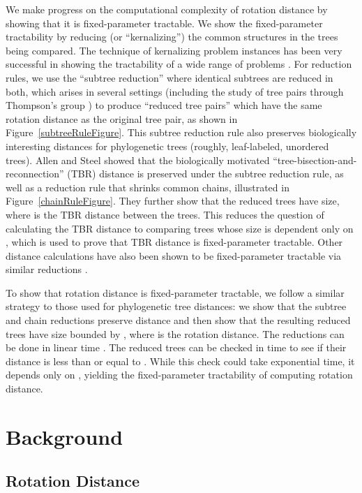 \documentclass[12pt]{article}
\begin{document}
We
make progress on the computational complexity of rotation distance by showing that it
is fixed-parameter tractable.  
We show the fixed-parameter tractability by reducing (or ``kernalizing'') the
common structures in the trees being compared.  
The technique of kernalizing problem instances has been very successful in 
showing the tractability of a wide range of problems \cite{Fellows2006a,Guo2007a}.
For
reduction rules, we use the ``subtree reduction'' where
identical subtrees are reduced in both, which arises in several settings
(including the study of tree pairs through Thompson's group 
\cite{rotbound, rotipl, rightarm}) to produce ``reduced tree pairs''  which have 
 the same rotation distance as 
the original tree pair, as shown in Figure~\ref{subtreeRuleFigure}.  This subtree
reduction rule also preserves biologically interesting
distances for phylogenetic trees (roughly, leaf-labeled,
unordered trees).  Allen and Steel \cite{allenSteel} 
showed that the biologically motivated ``tree-bisection-and-reconnection'' (TBR)
distance is preserved under the subtree reduction
rule, as well as a reduction rule that shrinks common chains,
illustrated in Figure~\ref{chainRuleFigure}.
They further show that the reduced trees have
  size, where  is the TBR distance between the
trees.  This reduces the question of calculating the 
TBR distance to comparing trees whose size is 
dependent only on , which is used to prove that TBR distance 
is fixed-parameter tractable.  Other distance calculations
have also been shown to be fixed-parameter tractable
via similar reductions \cite{uSPRfpt,bordewichSemple,Bordewich2007}.

To show that rotation distance is fixed-parameter
tractable, we follow a similar strategy to those used
for phylogenetic tree distances:  we show that the
subtree and chain reductions preserve distance
and then show that the resulting reduced trees have size 
bounded by , 
where  is the rotation distance.  The
reductions can be done in linear time \cite{approx}.  
The reduced
trees can be checked in  time to see if their
distance is less than or equal to .  While this check 
could take exponential time, it depends only
on , yielding the fixed-parameter tractability of computing
rotation distance.


\section{Background}



\subsection*{Rotation Distance}
\end{document}
